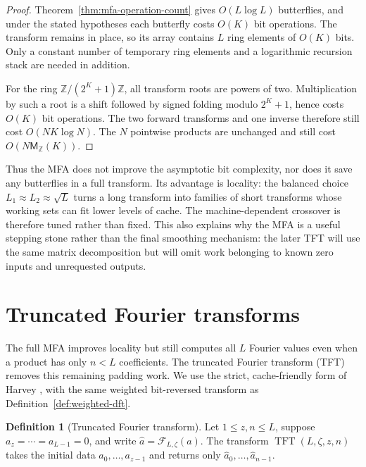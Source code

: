 \documentclass[11pt]{book}
\theoremstyle{definition}
\newtheorem{definition}[theorem]{Definition}
\newcommand{\ZZ}{\mathbb Z}
\newcommand{\MZ}{\mathsf M_{\ZZ}}
\begin{document}
\begin{proof}
Theorem~\ref{thm:mfa-operation-count} gives $O(L\log L)$ butterflies, and
under the stated hypotheses each butterfly costs $O(K)$ bit operations.
The transform remains in place, so its array contains $L$ ring elements of
$O(K)$ bits.  Only a constant number of temporary ring elements and a
logarithmic recursion stack are needed in addition.

For the ring $\ZZ/(2^K+1)\ZZ$, all transform roots are powers of two.
Multiplication by such a root is a shift followed by signed folding modulo
$2^K+1$, hence costs $O(K)$ bit operations.  The two forward transforms and
one inverse therefore still cost $O(NK\log N)$.  The $N$ pointwise products
are unchanged and still cost $O(N\MZ(K))$.
\end{proof}

Thus the MFA does not improve the asymptotic bit complexity, nor does it save
any butterflies in a full transform.  Its advantage is locality: the balanced
choice $L_1\approx L_2\approx\sqrt L$ turns a long transform into families of
short transforms whose working sets can fit lower levels of cache.  The
machine-dependent crossover is therefore tuned rather than fixed.  This also
explains why the MFA is a useful stepping stone rather than the final
smoothing mechanism: the later TFT will use the same matrix decomposition but
will omit work belonging to known zero inputs and unrequested outputs.

\section{Truncated Fourier transforms}
\label{sec:tft}

The full MFA improves locality but still computes all $L$ Fourier values even
when a product has only $n<L$ coefficients.  The truncated Fourier transform
(TFT) removes this remaining padding work.  We use the strict, cache-friendly
form of Harvey \cite{Harvey2008CacheTFT}, with the same weighted bit-reversed
transform as Definition~\ref{def:weighted-dft}.

\begin{definition}[Truncated Fourier transform]
\label{def:tft}
Let $1\leq z,n\leq L$, suppose $a_z=\cdots=a_{L-1}=0$, and write
$\widehat a=\mathcal F_{L,\zeta}(a)$.  The transform
$\operatorname{TFT}(L,\zeta,z,n)$ takes the initial data
$a_0,\ldots,a_{z-1}$ and returns only
$\widehat a_0,\ldots,\widehat a_{n-1}$.
\end{definition}
\end{document}
